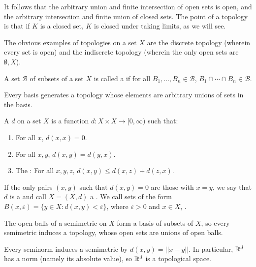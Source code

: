 \begin{subsec}
It follows that the arbitrary union and finite intersection of open sets is open, and the arbitrary intersection and finite union of closed sets.
The point of a topology is that if $K$ is a closed set, $K$ is closed under taking limits, as we will see.
\end{subsec}

\begin{subsec}
The obvious examples of topologies on a set $X$ are the discrete topology (wherein every set is open) and the indiscrete topology (wherein the only open sets are $\emptyset, X$).
\end{subsec}

\begin{definition}
A set $\mathcal B$ of subsets of a set $X$ is called a  if for all $B_{1}, \dots, B_{n} \in \mathcal B$, $B_{1} \cap \cdots \cap B_{n} \in \mathcal B$.
\end{definition}

\begin{subsec}
Every basis generates a topology whose elements are arbitrary unions of sets in the basis.
\end{subsec}

\begin{definition}
A  $d$ on a set $X$ is a function $d: X \times X \to [0, \infty)$ such that:
\begin{enumerate}
\item For all $x$, $d(x, x) = 0$.
\item For all $x,y$, $d(x, y) = d(y, x)$.
\item The : For all $x,y,z$, $d(x, y) \leq d(x, z) + d(z, x)$.
\end{enumerate}
If the only pairs $(x, y)$ such that $d(x, y) = 0$ are those with $x=y$, we say that $d$ is a  and call $X = (X,d)$ a .
We call sets of the form $B(x, \varepsilon) = \{y \in X: d(x, y) < \varepsilon\}$, where $\varepsilon > 0$ and $x \in X$, .
\end{definition}

\begin{subsec}
The open balls of a semimetric on $X$ form a basis of subsets of $X$, so every semimetric induces a topology, whose open sets are unions of open balls.
\end{subsec}

\begin{example}
Every seminorm induces a semimetric by $d(x, y) = ||x - y||$.
In particular, $\mathbb{R}^{d}$ has a norm (namely its absolute value), so $\mathbb{R}^{d}$ is a topological space.
\end{example}

